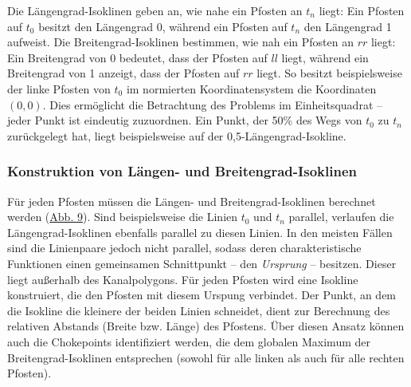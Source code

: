 Die Längengrad-Isoklinen geben an, wie nahe ein Pfosten an \(t_n\) liegt: Ein Pfosten auf \(t_0\) besitzt den Längengrad 0, während ein Pfosten auf \(t_n\) den Längengrad 1 aufweist. Die Breitengrad-Isoklinen bestimmen, wie nah ein Pfosten an \(rr\) liegt: Ein Breitengrad von 0 bedeutet, dass der Pfosten auf \(ll\) liegt, während ein Breitengrad von 1 anzeigt, dass der Pfosten auf \(rr\) liegt. So besitzt beispielsweise der linke Pfosten von \(t_0\) im normierten Koordinatensystem die Koordinaten \((0,0)\). Dies ermöglicht die Betrachtung des Problems im Einheitsquadrat – jeder Punkt ist eindeutig zuzuordnen. Ein Punkt, der 50\% des Wegs von \(t_0\) zu \(t_n\) zurückgelegt hat, liegt beispielsweise auf der 0,5-Längengrad-Isokline.

\subsubsection{Konstruktion von Längen- und Breitengrad-Isoklinen}
Für jeden Pfosten müssen die Längen- und Breitengrad-Isoklinen berechnet werden (\hyperref[fig:isoklinen]{Abb. 9}). Sind beispielsweise die Linien \(t_0\) und \(t_n\) parallel, verlaufen die Längengrad-Isoklinen ebenfalls parallel zu diesen Linien. In den meisten Fällen sind die Linienpaare jedoch nicht parallel, sodass deren charakteristische Funktionen einen gemeinsamen Schnittpunkt – den \emph{Ursprung} – besitzen. Dieser liegt außerhalb des Kanalpolygons. Für jeden Pfosten wird eine Isokline konstruiert, die den Pfosten mit diesem Urspung verbindet. Der Punkt, an dem die Isokline die kleinere der beiden Linien schneidet, dient zur Berechnung des relativen Abstands (Breite bzw. Länge) des Pfostens. Über diesen Ansatz können auch die Chokepoints identifiziert werden, die dem globalen Maximum der Breitengrad-Isoklinen entsprechen (sowohl für alle linken als auch für alle rechten Pfosten).


